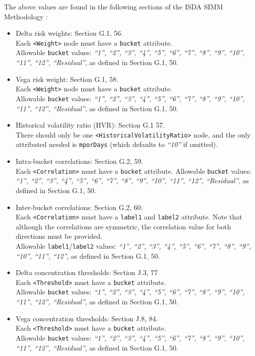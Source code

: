 The above values are found in the following sections of the ISDA SIMM Methodology \cite{SIMM2.5A}:
\begin{itemize}
  \item Delta risk weights: Section G.1, 56. \\
    Each {\tt <Weight>} node must have a {\tt bucket} attribute.\\
    Allowable {\tt bucket} values: \emph{``1'', ``2'', ``3'', ``4'', ``5'', ``6'', ``7'', ``8'', ``9'', ``10'', ``11'', ``12'', ``Residual''}, as defined in Section G.1, 50.
  \item Vega risk weight: Section G.1, 58. \\
    Each {\tt <Weight>} node must have a {\tt bucket} attribute. \\
    Allowable {\tt bucket} values: \emph{``1'', ``2'', ``3'', ``4'', ``5'', ``6'', ``7'', ``8'', ``9'', ``10'', ``11'', ``12'', ``Residual''}, as defined in Section G.1, 50.
  \item Historical volatility ratio (HVR): Section G.1 57. \\
    There should only be one {\tt <HistoricalVolatilityRatio>} node, and the only attributed needed is {\tt mporDays} (which defaults to \emph{``10''} if omitted).
  \item Intra-bucket correlations: Section G.2, 59. \\
    Each {\tt <Correlation>} must have a {\tt bucket} attribute.
    Allowable {\tt bucket} values: \emph{``1'', ``2'', ``3'', ``4'', ``5'', ``6'', ``7'', ``8'', ``9'', ``10'', ``11'', ``12'', ``Residual''}, as defined in Section G.1, 50.
  \item Inter-bucket correlations: Section G.2, 60. \\
    Each {\tt <Correlation>} must have a {\tt label1} and {\tt label2} attribute. Note that although the correlations
    are symmetric, the correlation value for both directions must be provided. \\
    Allowable {\tt label1}/{\tt label2} values: \emph{``1'', ``2'', ``3'', ``4'', ``5'', ``6'', ``7'', ``8'', ``9'', ``10'', ``11'', ``12''}, as defined in Section G.1, 50.
  \item Delta concentration thresholds: Section J.3, 77 \\
    Each {\tt <Threshold>} must have a {\tt bucket} attribute. \\
    Allowable {\tt bucket} values: \emph{``1'', ``2'', ``3'', ``4'', ``5'', ``6'', ``7'', ``8'', ``9'', ``10'', ``11'', ``12'', ``Residual''}, as defined in Section G.1, 50.
  \item Vega concentration thresholds: Section J.8, 84. \\
    Each {\tt <Threshold>} must have a {\tt bucket} attribute. \\
    Allowable {\tt bucket} values: \emph{``1'', ``2'', ``3'', ``4'', ``5'', ``6'', ``7'', ``8'', ``9'', ``10'', ``11'', ``12'', ``Residual''}, as defined in Section G.1, 50.
\end{itemize}

